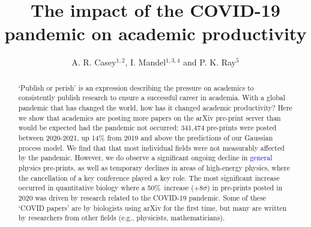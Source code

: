 \documentclass[]{rsos}%
\newcommand{\add}[1]{\textcolor{blue}{#1}}
\begin{document}
\title{The impact of the COVID-19 pandemic on academic productivity}

\author{%
A. R. Casey$^{1,2}$,  I. Mandel$^{1,3,4}$ and P. K. Ray$^{5}$}

\address{$^1$School of Physics \& Astronomy, Monash University, Clayton 3800, Victoria, Australia\\
$^2$ARC Centre of Excellence for Astrophysics in Three Dimensions (ASTRO-3D), Australia\\
$^3$OzGrav, Australian Research Council Centre of Excellence for Gravitational Wave Discovery, Australia\\
$^4$Institute of Gravitational Wave Astronomy and School of Physics and Astronomy, University of Birmingham, Birmingham, B15 2TT, United Kingdom\\
$^5$Department of Mathematics, Imperial College London, London, United Kingdom
}

\subject{xxxxx, xxxxx, xxxx}



\begin{abstract}
`Publish or perish’ is an expression describing the pressure on academics to consistently publish research to ensure a successful career in academia. 
With a global pandemic that has changed the world, how has it changed academic productivity? 
Here we show that academics are posting more papers on the arXiv pre-print server than would be expected had the pandemic not occurred: 341,474 pre-prints were posted between 2020-2021, up 14\% from 2019 and above the predictions of our Gaussian process model.
We find that that most individual fields were not measurably affected by the pandemic.
However, we do observe a significant ongoing decline in \add{general} physics pre-prints, as well as temporary declines in areas of high-energy physics, where the cancellation of a key conference played a key role.
The most significant increase occurred in quantitative biology where a 50\%~increase ($+8\sigma$) in pre-prints posted in 2020 was driven by research related to the COVID-19 pandemic. 
Some of these `COVID papers' are by biologists using arXiv for the first time, but many are written by researchers from other fields (e.g., physicists, mathematicians). 
\end{abstract}
\end{document}
